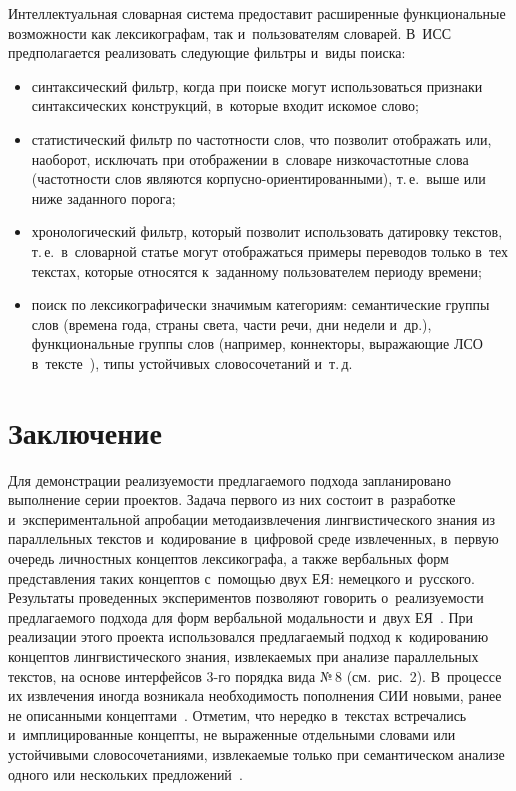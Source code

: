 \begin{multicols}{2}
  Интеллектуальная словарная сис\-те\-ма предоставит расширенные функциональные возможности как 
лексикографам, так и~пользователям словарей. В~ИСС 
предполагается 
реализовать сле\-ду\-ющие фильт\-ры и~виды поиска:
  \begin{itemize}
  \item синтаксический фильтр, когда при поиске могут использоваться 
признаки синтаксических конструкций, в~которые входит искомое слово;
  \item статистический фильтр по частотности слов, что позволит отображать 
или, наоборот, исключать при отображении в~словаре низкочастотные слова 
(частотности слов являются корпусно-ориентированными), т.\,е.\ выше или 
ниже заданного порога;
  \item хронологический фильтр, который позволит использовать датировку 
текстов, т.\,е.\ в~словарной статье могут отображаться примеры переводов 
только в~тех текстах, которые относятся к~заданному пользователем периоду 
времени;
  \item поиск по лексикографически значимым категориям: семантические группы слов 
(времена года, страны света, части речи, дни недели и~др.), функциональные 
группы слов (например, коннекторы, выражающие  
ЛСО в~тексте~\cite{17-zac}), типы 
устойчивых словосочетаний и~т.\,д.
  \end{itemize}
  
\section{Заключение}

  Для демонстрации реализуемости пред\-ла\-га\-емого подхода запланировано 
выполнение серии проек\-тов. Задача первого из них состоит в~разработке 
и~экспериментальной апробации метода\linebreak извлечения лингвистического знания 
из параллельных текстов и~кодирование в~цифровой среде извлеченных, 
в~первую очередь личностных концептов лексикографа, а также вербальных 
форм пред\-став\-ле\-ния таких концептов с~помощью двух ЕЯ: немецкого 
и~русского. Результаты проведенных экспериментов позволяют говорить 
о~реализуемости предлагаемого подхода для форм вербальной модальности 
и~двух ЕЯ~\cite{32-zac, 33-zac, 34-zac, 35-zac}. При реализации этого проекта 
использовался предлагаемый подход к~кодированию концептов 
лингвистического знания, извлекаемых при анализе параллельных текстов, на 
основе интерфейсов 3-го порядка вида №\,8 (см.\ рис.~2). В~процессе их извлечения 
иногда возникала необходимость пополнения СИИ новыми, ранее не 
описанными концептами~\cite{32-zac, 34-zac}. Отметим, что нередко в~текстах 
встречались и~имплицированные концепты, не выраженные отдельными 
словами или устойчивыми словосочетаниями, извле\-ка\-емые только при 
семантическом анализе одного или нескольких предложений~\cite{15-zac}.
  

\end{multicols}
